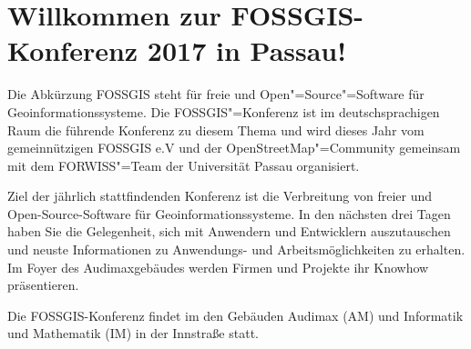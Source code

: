 \newpage
\section*{Willkommen zur FOSSGIS-Konferenz 2017 in Passau!} \label{welcome}
Die Abkürzung FOSSGIS steht
für freie und Open"=Source"=Software für Geoinformationssysteme.
Die FOSSGIS"=Konferenz ist im deutschsprachigen Raum die führende Konferenz zu diesem Thema
und wird dieses Jahr vom gemeinnützigen FOSSGIS e.V und der OpenStreetMap"=Community
gemeinsam mit dem FORWISS"=Team der Universität Passau organisiert.

Ziel der jährlich stattfindenden Konferenz ist die Verbreitung von freier und
Open-Source-Software für Geoinformationssysteme.  In den nächsten drei Tagen
haben Sie die Gelegenheit, sich mit Anwendern und Entwicklern auszutauschen und
neuste Informationen zu Anwendungs- und Arbeitsmöglichkeiten zu erhalten. Im
Foyer des Audimaxgebäudes werden Firmen und Projekte ihr Knowhow präsentieren.

Die FOSSGIS-Konferenz findet im den Gebäuden Audimax (AM) und Informatik und
Mathematik (IM) in der Innstraße statt.

\newpage

